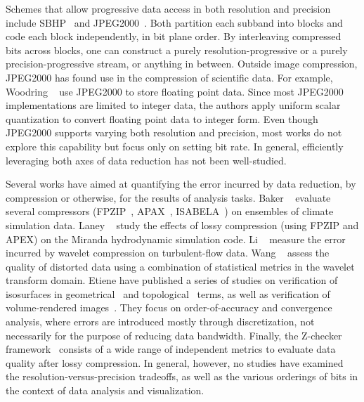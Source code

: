 Schemes that allow progressive data access in both resolution and precision include
SBHP~\cite{sbhp2000} and JPEG2000~\cite{jpeg2000}. Both partition each subband into blocks and code
each block independently, in bit plane order. By interleaving compressed bits across blocks, one can
construct a purely resolution-progressive or a purely precision-progressive stream, or anything in
between. Outside image compression, JPEG2000 has found use in the compression of scientific data.
For example, Woodring \etal~\cite{woodring2011} use JPEG2000 to store floating point data. Since
most JPEG2000 implementations are limited to integer data, the authors apply uniform scalar
quantization to convert floating point data to integer form. Even though JPEG2000 supports varying
both resolution and precision, most works do not explore this capability but focus only on setting
bit rate. In general, efficiently leveraging both axes of data reduction has not been well-studied.

Several works have aimed at quantifying the error incurred by data reduction, by compression or
otherwise, for the results of analysis tasks. Baker \etal~\cite{evaluating-compression-climate}
evaluate several compressors (FPZIP~\cite{fpzip}, APAX~\cite{apax}, ISABELA~\cite{isabela}) on
ensembles of climate simulation data. Laney \etal~\cite{compression_sim2013} study the effects of
lossy compression (using FPZIP and APEX) on the Miranda hydrodynamic simulation code. Li
\etal~\cite{evaluating-efficacy-wavelet} measure the error incurred by wavelet compression on
turbulent-flow data. Wang \etal~\cite{statistical-volume-quality} assess the quality of distorted
data using a combination of statistical metrics in the wavelet transform domain. Etiene \etal have
published a series of studies on verification of isosurfaces in
geometrical~\cite{verifiable-isosurface} and topological~\cite{topology-verification-isosurface}
terms, as well as verification of volume-rendered images~\cite{verifying-volume-rendering}. They
focus on order-of-accuracy and convergence analysis, where errors are introduced mostly through
discretization, not necessarily for the purpose of reducing data bandwidth. Finally, the Z-checker
framework~\cite{z-checker} consists of a wide range of independent metrics to evaluate data quality
after lossy compression. In general, however, no studies have examined the
resolution-versus-precision tradeoffs, as well as the various orderings of bits in the context of
data analysis and visualization.


